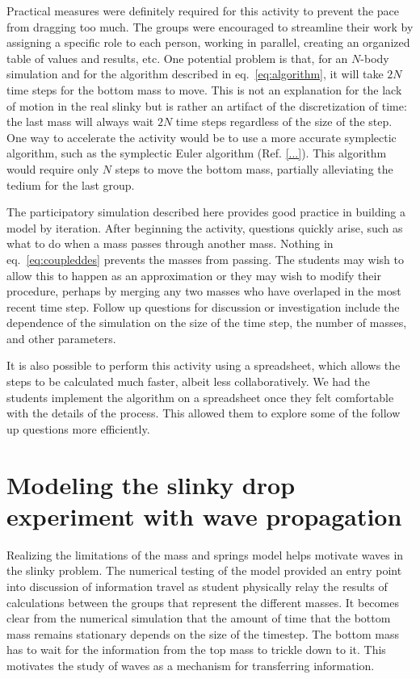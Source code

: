 \documentclass[aps,pre,10pt,superscriptaddress,showpacs,amsmath,amssymb,nofootinbib]{revtex4-1}
\newcommand{\eq}[1]{eq.~\eqref{eq:#1}}
\begin{document}
Practical measures were definitely required for this activity to prevent the pace from dragging
too much. The groups were encouraged to streamline their work by assigning a specific
role to each person, working in parallel, creating an organized table of values and results,
etc. One potential problem is that, for an $N$-body simulation and for the algorithm described in \eq{algorithm},
it will take $2N$ time steps for the bottom mass to move. This is not an explanation for
the lack of motion in the real slinky but is rather an artifact of the discretization of time:
the last mass will always wait $2N$ time steps regardless of the size of the step. One way to
accelerate the activity would be to use a more accurate symplectic algorithm, such as the
symplectic Euler algorithm (Ref. \ref{...}). This algorithm would require only $N$ steps to move the bottom
mass, partially alleviating the tedium for the last group.

The participatory simulation described here provides good practice in building
a model by iteration. After beginning the activity, questions quickly arise, such
as what to do when a mass passes through another mass. Nothing in \eq{coupleddes} prevents
the masses from passing. The students may wish to allow this to happen as an approximation
or they may wish to modify their procedure, perhaps by merging any two masses who have overlaped
in the most recent time step. Follow up questions for discussion or investigation include
the dependence of the simulation on the size of the time step, the number of masses,
and other parameters.

It is also possible to perform this activity using a spreadsheet, which allows the steps to be
calculated much faster, albeit less collaboratively. We had the students implement the algorithm on a spreadsheet once they
felt comfortable with the details of the process. This allowed them to explore some of the follow
up questions more efficiently.

\section{Modeling the slinky drop experiment with wave propagation}
\label{sec:information}

Realizing the limitations of the  mass and springs model helps motivate waves in
the slinky problem.  The numerical testing of the model provided an entry point
into discussion of information travel as student  physically relay the results
of calculations between the groups that represent the different masses.  It
becomes clear from the numerical simulation that the amount of time that the
bottom mass remains stationary depends on the size of the timestep.  The bottom
mass has to wait for the information from the top mass to trickle down to it. 
This motivates the study of waves as a mechanism for transferring information.
\end{document}
